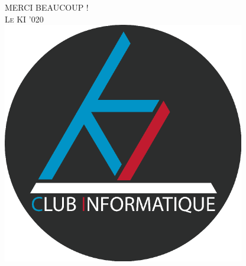 \documentclass[handout]{beamer}
\begin{document}
\begin{frame}
	\centering
	\Huge
	\textsc{MERCI BEAUCOUP !}\\
	\vspace*{2cm}
	\normalsize
	\textsc{Le KI '020}\\
	\vspace*{1cm}
	\centering
	\includegraphics[scale=0.2]{logo-ki.png}
\end{frame}
\end{document}
